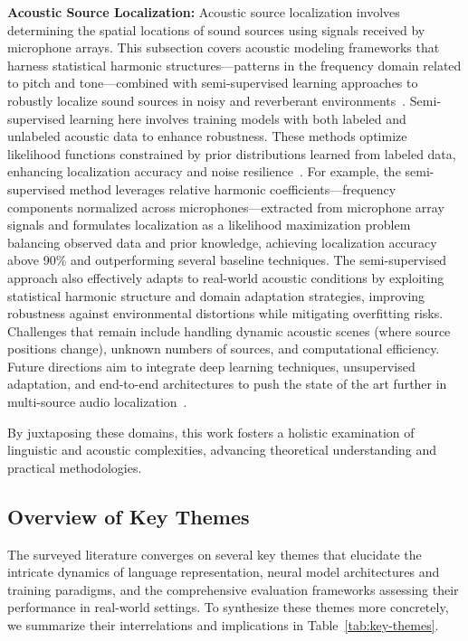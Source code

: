 \documentclass[sigconf]{acmart}
\begin{document}
\textbf{Acoustic Source Localization:} Acoustic source localization involves determining the spatial locations of sound sources using signals received by microphone arrays. This subsection covers acoustic modeling frameworks that harness statistical harmonic structures—patterns in the frequency domain related to pitch and tone—combined with semi-supervised learning approaches to robustly localize sound sources in noisy and reverberant environments~\cite{ref1,ref2,ref3,ref26,ref51,ref52}. Semi-supervised learning here involves training models with both labeled and unlabeled acoustic data to enhance robustness. These methods optimize likelihood functions constrained by prior distributions learned from labeled data, enhancing localization accuracy and noise resilience~\cite{ref52}. For example, the semi-supervised method leverages relative harmonic coefficients—frequency components normalized across microphones—extracted from microphone array signals and formulates localization as a likelihood maximization problem balancing observed data and prior knowledge, achieving localization accuracy above 90\% and outperforming several baseline techniques. The semi-supervised approach also effectively adapts to real-world acoustic conditions by exploiting statistical harmonic structure and domain adaptation strategies, improving robustness against environmental distortions while mitigating overfitting risks. Challenges that remain include handling dynamic acoustic scenes (where source positions change), unknown numbers of sources, and computational efficiency. Future directions aim to integrate deep learning techniques, unsupervised adaptation, and end-to-end architectures to push the state of the art further in multi-source audio localization~\cite{ref52}.

By juxtaposing these domains, this work fosters a holistic examination of linguistic and acoustic complexities, advancing theoretical understanding and practical methodologies.

\subsection{Overview of Key Themes}

The surveyed literature converges on several key themes that elucidate the intricate dynamics of language representation, neural model architectures and training paradigms, and the comprehensive evaluation frameworks assessing their performance in real-world settings. To synthesize these themes more concretely, we summarize their interrelations and implications in Table~\ref{tab:key-themes}.
\end{document}
